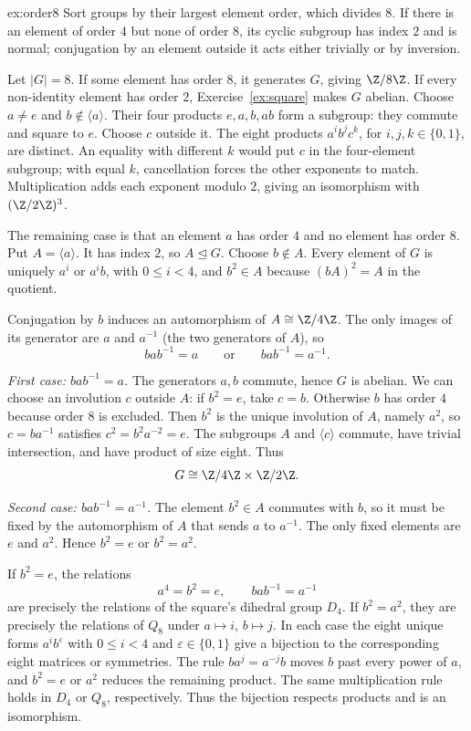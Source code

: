 \begin{solution}{ex:order8}
\idea Sort groups by their largest element order, which divides $8$. If there is an element of order $4$ but none of order $8$, its cyclic subgroup has index $2$ and is normal; conjugation by an element outside it acts either trivially or by inversion.

\writeup Let $|G|=8$. If some element has order $8$, it generates $G$, giving $\Z/8\Z$. If every non-identity element has order $2$, Exercise~\ref{ex:square} makes $G$ abelian. Choose $a\ne e$ and $b\notin\langle a\rangle$. Their four products $e,a,b,ab$ form a subgroup: they commute and square to $e$. Choose $c$ outside it. The eight products $a^i b^j c^k$, for $i,j,k\in\{0,1\}$, are distinct. An equality with different $k$ would put $c$ in the four-element subgroup; with equal $k$, cancellation forces the other exponents to match. Multiplication adds each exponent modulo $2$, giving an isomorphism with $(\Z/2\Z)^3$.

The remaining case is that an element $a$ has order $4$ and no element has order $8$. Put $A=\langle a\rangle$. It has index $2$, so $A\trianglelefteq G$. Choose $b\notin A$. Every element of $G$ is uniquely $a^i$ or $a^ib$, with $0\le i<4$, and $b^2\in A$ because $(bA)^2=A$ in the quotient.

Conjugation by $b$ induces an automorphism of $A\cong\Z/4\Z$. The only images of its generator are $a$ and $a^{-1}$ (the two generators of $A$), so
\[
bab^{-1}=a\qquad\text{or}\qquad bab^{-1}=a^{-1}.
\]

\emph{First case: $bab^{-1}=a$.} The generators $a,b$ commute, hence $G$ is abelian. We can choose an involution $c$ outside $A$: if $b^2=e$, take $c=b$. Otherwise $b$ has order $4$ because order $8$ is excluded. Then $b^2$ is the unique involution of $A$, namely $a^2$, so $c=ba^{-1}$ satisfies $c^2=b^2a^{-2}=e$. The subgroups $A$ and $\langle c\rangle$ commute, have trivial intersection, and have product of size eight. Thus
\[
G\cong\Z/4\Z\times\Z/2\Z.
\]

\emph{Second case: $bab^{-1}=a^{-1}$.} The element $b^2\in A$ commutes with $b$, so it must be fixed by the automorphism of $A$ that sends $a$ to $a^{-1}$. The only fixed elements are $e$ and $a^2$. Hence $b^2=e$ or $b^2=a^2$.

If $b^2=e$, the relations
\[
a^4=b^2=e,\qquad bab^{-1}=a^{-1}
\]
are precisely the relations of the square's dihedral group $D_4$. If $b^2=a^2$, they are precisely the relations of $Q_8$ under $a\mapsto i$, $b\mapsto j$. In each case the eight unique forms $a^ib^\varepsilon$ with $0\le i<4$ and $\varepsilon\in\{0,1\}$ give a bijection to the corresponding eight matrices or symmetries. The rule $ba^j=a^{-j}b$ moves $b$ past every power of $a$, and $b^2=e$ or $a^2$ reduces the remaining product. The same multiplication rule holds in $D_4$ or $Q_8$, respectively. Thus the bijection respects products and is an isomorphism.


\end{solution}

